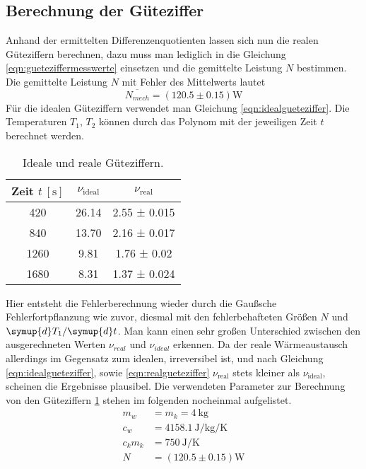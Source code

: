 \subsection{Berechnung der Güteziffer}
Anhand der ermittelten Differenzenquotienten lassen sich nun die realen Güteziffern berechnen, dazu muss man lediglich in die Gleichung \eqref{eqn:gueteziffermesswerte} einsetzen und die
gemittelte Leistung $N$ bestimmen.
Die gemittelte Leistung $N$ mit Fehler des Mittelwerts lautet
\begin{equation}
\overline{N_{mech}} = (120.5 \pm 0.15) \text{W}
\end{equation}
Für die idealen Güteziffern verwendet man Gleichung \eqref{eqn:idealgueteziffer}. Die Temperaturen $T_{1}$, $T_{2}$ können durch das Polynom mit der jeweiligen Zeit $t$ berechnet werden.
\begin{table}
  \centering
  \caption{Ideale und reale Güteziffern.}
  \label{tab:gueteziffernidealundreal}
  \begin{tabular}{c c c}
    \toprule
    Zeit {$t \: [\si{\second}]$} & {$\nu_\text{ideal}$} & {$\nu_\text{real}$} \\
    \midrule
    420  & 26.14 & 2.55 ± 0.015 \\
    840  & 13.70 & 2.16 ± 0.017 \\
    1260  &  9.81 & 1.76 ± 0.02 \\
    1680 &  8.31 & 1.37 ± 0.024\\
    \bottomrule
  \end{tabular}
\end{table}
Hier entsteht die Fehlerberechnung wieder durch die Gaußsche Fehlerfortpflanzung wie zuvor, diesmal mit den fehlerbehafteten Größen $N$ und ${\symup{d}T_{1}}/{\symup{d}t}$.
Man kann einen sehr großen Unterschied zwischen den ausgerechneten Werten $\nu_{real}$ und $\nu_{ideal}$ erkennen. Da der reale Wärmeaustausch allerdings im Gegensatz zum idealen, irreversibel ist,
und nach Gleichung \eqref{eqn:idealgueteziffer}, sowie \eqref{eqn:realgueteziffer} $\nu_{\text{real}}$ stets kleiner als $\nu_{\text{ideal}}$, scheinen die Ergebnisse plausibel.
Die verwendeten Parameter zur Berechnung von den Güteziffern \ref{tab:gueteziffernidealundreal} stehen im folgenden nocheinmal aufgelistet.
\begin{align}
m_{w} &= m_{k} = \SI{4}{\kilo\gram} \\
c_{w} &= \SI{4158.1}{\joule\per\kilo\gram\per\kelvin}\\
c_{k}m_{k} &= \SI{750}{\joule\per\kelvin}\\
N &= (120.5 \pm 0.15) \text{W}
\end{align}
